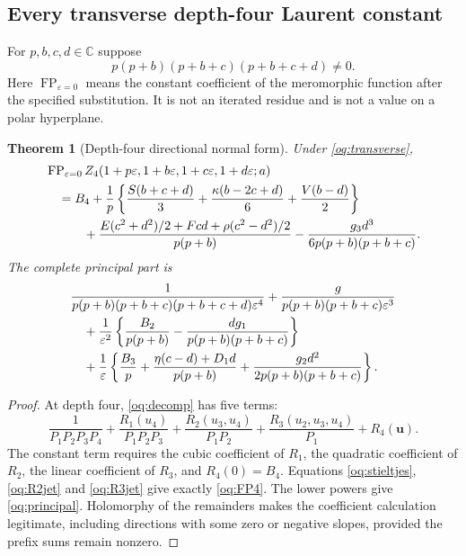 \documentclass[11pt,a4paper]{article}
\numberwithin{equation}{section}
\newtheorem{theorem}{Theorem}[section]
\theoremstyle{definition}
\theoremstyle{remark}
\begin{document}
\subsection{Every transverse depth-four Laurent constant}

For $p,b,c,d\in\mathbb C$ suppose
\begin{equation}\label{oq:transverse}
 p(p+b)(p+b+c)(p+b+c+d)\ne0.
\end{equation}
Here $\operatorname{FP}_{\varepsilon=0}$ means the constant coefficient
of the meromorphic function after the specified substitution. It is not
an iterated residue and is not a value on a polar hyperplane.

\begin{theorem}[Depth-four directional normal form]\label{oq:main}
Under \eqref{oq:transverse},
\begin{align}\label{oq:FP4}
 &\operatorname{FP}_{\varepsilon=0}
 Z_4(1+p\varepsilon,1+b\varepsilon,1+c\varepsilon,1+d\varepsilon;a)
 \notag\\
 &\quad=B_4+
 \frac1p\left\{\frac{S(b+c+d)}3+
            \frac{\kappa(b-2c+d)}6+\frac{V(b-d)}2\right\}
 \notag\\
 &\qquad\quad+
 \frac{E(c^2+d^2)/2+Fcd+\rho(c^2-d^2)/2}{p(p+b)}
 -\frac{g_3d^3}{6p(p+b)(p+b+c)}.
\end{align}
The complete principal part is
\begin{align}\label{oq:principal}
 &\frac{1}{p(p+b)(p+b+c)(p+b+c+d)\varepsilon^4}
 +\frac{g}{p(p+b)(p+b+c)\varepsilon^3}
 \notag\\
 &\quad+\frac1{\varepsilon^2}
 \left\{\frac{B_2}{p(p+b)}-
 \frac{dg_1}{p(p+b)(p+b+c)}\right\}
 \notag\\
 &\quad+\frac1\varepsilon
 \left\{\frac{B_3}p+
 \frac{\eta(c-d)+D_1d}{p(p+b)}+
 \frac{g_2d^2}{2p(p+b)(p+b+c)}\right\}.
\end{align}
\end{theorem}
\begin{proof}
At depth four, \eqref{oq:decomp} has five terms:
\[
 \frac1{P_1P_2P_3P_4}+
 \frac{R_1(u_4)}{P_1P_2P_3}+
 \frac{R_2(u_3,u_4)}{P_1P_2}+
 \frac{R_3(u_2,u_3,u_4)}{P_1}+R_4(\mathbf u).
\]
The constant term requires the cubic coefficient of $R_1$, the quadratic
coefficient of $R_2$, the linear coefficient of $R_3$, and $R_4(0)=B_4$.
Equations \eqref{oq:stieltjes}, \eqref{oq:R2jet} and \eqref{oq:R3jet}
give exactly \eqref{oq:FP4}. The lower powers give
\eqref{oq:principal}. Holomorphy of the remainders makes the coefficient
calculation legitimate, including directions with some zero or negative
slopes, provided the prefix sums remain nonzero.
\end{proof}
\end{document}
